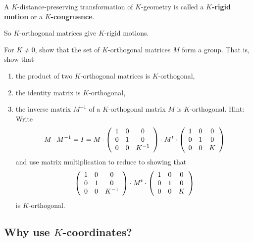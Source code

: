 \begin{definition}
A $K$-distance-preserving transformation of $K$-geometry is called a
$K$\textbf{-rigid motion} or a $K$\textbf{-congruence}.
\end{definition}

So $K$-orthogonal matrices give $K$-rigid motions.

\begin{exercise}
For $K\neq0$, show that the set of $K$-orthogonal matrices $M$ form a group.
That is, show that
\begin{enumerate}
\item the product of two $K$-orthogonal matrices is $K$-orthogonal,

\item the identity matrix is $K$-orthogonal,

\item the inverse matrix $M^{-1}$ of a $K$-orthogonal matrix $M$ is $K$-orthogonal.
Hint: Write%
\[
M\cdot M^{-1}=I=M\cdot\left(
\begin{array}
[c]{ccc}%
1 & 0 & 0\\
0 & 1 & 0\\
0 & 0 & K^{-1}%
\end{array}
\right)  \cdot M^{t}\cdot\left(
\begin{array}
[c]{ccc}%
1 & 0 & 0\\
0 & 1 & 0\\
0 & 0 & K
\end{array}
\right)
\]
and use matrix multiplication to reduce to showing that
\[
\left(
\begin{array}
[c]{ccc}%
1 & 0 & 0\\
0 & 1 & 0\\
0 & 0 & K^{-1}%
\end{array}
\right)  \cdot M^{t}\cdot\left(
\begin{array}
[c]{ccc}%
1 & 0 & 0\\
0 & 1 & 0\\
0 & 0 & K
\end{array}
\right)
\]
is $K$-orthogonal.
\end{enumerate}
\end{exercise}

\subsection*{Why use $K$-coordinates?}

